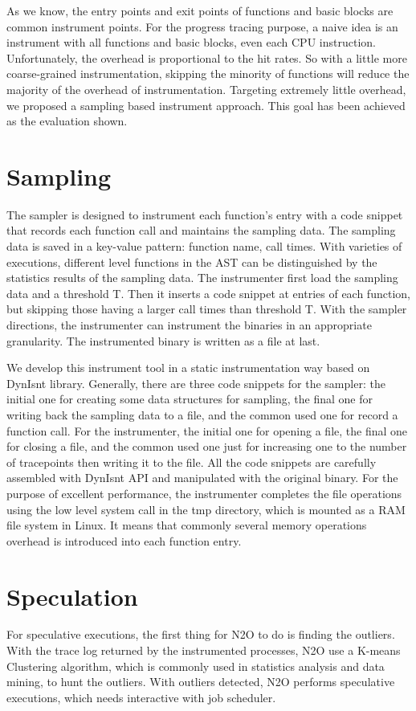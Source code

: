 As we know, the entry points and exit points of functions and basic blocks are common instrument points. For the progress tracing purpose, a naive idea is an instrument with all functions and basic blocks, even each CPU instruction. Unfortunately, the overhead is proportional to the hit rates. So with a little more coarse-grained instrumentation, skipping the minority of functions will reduce the majority of the overhead of instrumentation. Targeting extremely little overhead, we proposed a sampling based instrument approach. This goal has been achieved as the evaluation shown.

\section{Sampling}

The sampler is designed to instrument each function’s entry with a code snippet that records each function call and maintains the sampling data. The sampling data is saved in a key-value pattern: function name, call times. With varieties of executions, different level functions in the AST can be distinguished by the statistics results of the sampling data. The instrumenter first load the sampling data and a threshold T. Then it inserts a code snippet at entries of each function, but skipping those having a larger call times than threshold T. With the sampler directions, the instrumenter can instrument the binaries in an appropriate granularity. The instrumented binary is written as a file at last.

We develop this instrument tool in a static instrumentation way based on DynIsnt library. Generally, there are three code snippets for the sampler: the initial one for creating some data structures for sampling, the final one for writing back the sampling data to a file, and the common used one for record a function call. For the instrumenter, the initial one for opening a file, the final one for closing a file, and the common used one just for increasing one to the number of tracepoints then writing it to the file. All the code snippets are carefully assembled with DynIsnt API and manipulated with the original binary. For the purpose of excellent performance, the instrumenter completes the file operations using the low level system call in the tmp directory, which is mounted as a RAM file system in Linux. It means that commonly several memory operations overhead is introduced into each function entry.

\section{Speculation}
For speculative executions, the first thing for N2O to do is finding the outliers. With the trace log returned by the instrumented processes, N2O use a K-means Clustering algorithm, which is commonly used in statistics analysis and data mining, to hunt the outliers. With outliers detected, N2O performs speculative executions, which needs interactive with job scheduler.

